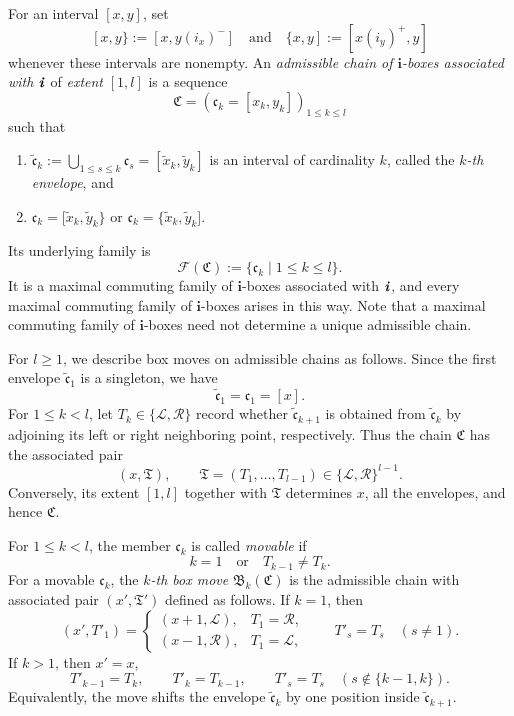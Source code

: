 \documentclass[12pt, leqno]{amsart}
\numberwithin{equation}{section}
\theoremstyle{plain}
\theoremstyle{definition}
\renewcommand{\ge}{\geqslant}
\newcommand{\seteq}{\mathbin{:=}}
\newcommand{\ii}{ \textbf{\textit{i}}}
\newcommand{\tx}{\widetilde{x}}
\newcommand{\ty}{\widetilde{y}}
\newcommand{\frakB}{\mathfrak{B}}
\newcommand{\frakC}{\mathfrak{C}}
\newcommand{\frakT}{\mathfrak{T}}
\newcommand{\frakc}{\mathfrak{c}}
\newcommand{\tfrakc}{\widetilde{\frakc}}
\newcommand{\bfi}{\mathbf{i}}
\newcommand{\calF}{\mathcal{F}}
\newcommand{\calL}{\mathcal{L}}
\newcommand{\calR}{\mathcal{R}}
\newcommand{\qtq}[1][{and}]{\quad\text{{#1}}\quad}
\newcommand{\ee}{\end{enumerate}}
\newcommand{\bnum}{\begin{enumerate}[{\rm (i)}]}
\begin{document}
For an interval \([x,y]\), set
\[
[x,y\}\seteq[x,y(i_x)^-] \qtq \{x,y]\seteq[x(i_y)^+,y]
\]
whenever these intervals are nonempty.  An
\emph{admissible chain of \(\bfi\)-boxes associated with \(\ii\)}
of \emph{extent} \([1,l]\) is a sequence
\[
\frakC=(\frakc_k=[x_k,y_k])_{1\leq k\leq l}
\]
such that
\bnum
\item
$\tfrakc_k \seteq \bigcup_{1\leq s\leq k}\frakc_s = [\tx_k,\ty_k]$
is an interval of cardinality \(k\), called the \emph{\(k\)-th envelope}, and
\item
$\frakc_k = [\tx_k,\ty_k\}$ or $\frakc_k = \{\tx_k,\ty_k]$.
\ee
Its underlying family is
\[
\calF(\frakC)\seteq\{\frakc_k\mid1\leq k\leq l\}.
\]
It is a maximal commuting family of \(\bfi\)-boxes associated with
\(\ii\), and every maximal commuting family of \(\bfi\)-boxes arises in this way.  Note that a maximal commuting family of \(\bfi\)-boxes need not
determine a unique admissible chain. 

For \(l\ge1\), we describe box moves on admissible chains as follows. Since the first
envelope $\tfrakc_1$ is a singleton, we have
\[
\tfrakc_1=\frakc_1=[x].
\]
For \(1\leq k<l\), let \(T_k\in\{\calL,\calR\}\) record whether
\(\tfrakc_{k+1}\) is obtained from
\(\tfrakc_k\) by adjoining its left or right neighboring
point, respectively.  Thus the chain \(\frakC\) has the associated
pair
\[
(x,\frakT),
\qquad
\frakT=(T_1,\ldots,T_{l-1})\in\{\calL,\calR\}^{l-1}.
\]
Conversely, its extent \([1,l]\) together with \(\frakT\) determines
\(x\), all the envelopes, and hence \(\frakC\).

For \(1\leq k<l\), the member \(\frakc_k\) is called
\emph{movable} if
\[
k=1
\quad\text{or}\quad
T_{k-1}\ne T_k.
\]
For a movable \(\frakc_k\), the \emph{\(k\)-th box move}
\(\frakB_k(\frakC)\) is the admissible chain with associated pair
\((x',\frakT')\) defined as follows.  If \(k=1\), then
\[
(x',T'_1)
=
\begin{cases}
(x+1,\calL),&T_1=\calR,\\
(x-1,\calR),&T_1=\calL,
\end{cases}
\qquad
T'_s=T_s\quad(s\ne1).
\]
If \(k>1\), then \(x'=x\),
\[
T'_{k-1}=T_k,
\qquad
T'_k=T_{k-1},
\qquad
T'_s=T_s\quad(s\notin\{k-1,k\}).
\]
Equivalently, the move shifts the envelope \(\tfrakc_k\)
by one position inside \(\tfrakc_{k+1}\). 
\end{document}
